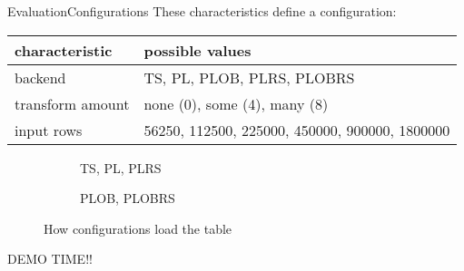 \begin{frame}[t]{Evaluation}{Configurations}
	These characteristics define a configuration:\\
	\begin{tabular}{|l|l|}
		\hline
		characteristic   & possible values                                \\
		\hline
		backend          & TS, PL, PLOB, PLRS, PLOBRS                     \\
		transform amount & none (0), some (4), many (8)                   \\
		input rows       & 56250, 112500, 225000, 450000, 900000, 1800000 \\
		\hline
	\end{tabular}
	 {
		\begin{figure}
			\begin{subfigure}{0.2\linewidth}
				\centering
				
				\caption{TS, PL, PLRS}
			\end{subfigure}
			\begin{subfigure}{0.2\linewidth}
				\centering
				
				\caption{PLOB, PLOBRS}
			\end{subfigure}
			\caption{How configurations load the table}
		\end{figure}
	}
\end{frame}

\begin{frame}
	\centering
	\large
	DEMO TIME!! %
\end{frame}


